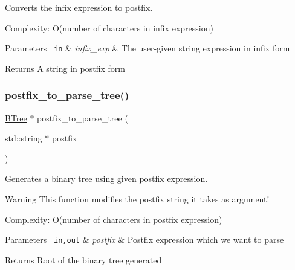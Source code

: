 Converts the infix expression to postfix. 

Complexity\+: O(number of characters in infix expression) 
\begin{DoxyParams}[1]{Parameters}
\mbox{\texttt{ in}}  & {\em infix\+\_\+exp} & The user-\/given string expression in infix form \\
\hline
\end{DoxyParams}
\begin{DoxyReturn}{Returns}
A string in postfix form 
\end{DoxyReturn}
\mbox{\label{classBTree_a628ffca8bc269400217fa849038b6684}} 
\subsubsection{\texorpdfstring{postfix\+\_\+to\+\_\+parse\+\_\+tree()}{postfix\_to\_parse\_tree()}}
{\footnotesize\ttfamily \mbox{\hyperlink{classBTree}{B\+Tree}} $\ast$ postfix\+\_\+to\+\_\+parse\+\_\+tree (\begin{DoxyParamCaption}\item[{std\+::string $\ast$}]{postfix }\end{DoxyParamCaption})\hspace{0.3cm}{\ttfamily [related]}}



Generates a binary tree using given postfix expression. 

\begin{DoxyWarning}{Warning}
This function modifies the postfix string it takes as argument!
\end{DoxyWarning}
Complexity\+: O(number of characters in postfix expression) 
\begin{DoxyParams}[1]{Parameters}
\mbox{\texttt{ in,out}}  & {\em postfix} & Postfix expression which we want to parse \\
\hline
\end{DoxyParams}
\begin{DoxyReturn}{Returns}
Root of the binary tree generated 
\end{DoxyReturn}
\mbox{\label{classBTree_a9804f1d5620990cac8ac016f30cb6f4f}} 
